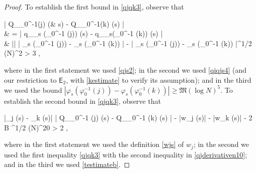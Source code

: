 \documentclass{amsart}
\numberwithin{equation}{section}
\theoremstyle{remark}
\theoremstyle{definition}
\begin{document}
 		\begin{proof} 
 			
 			To establish the first bound in \eqref{qjqk3}, observe that
 			\begin{flalign}
 				\label{qjqk4} 
 				\begin{aligned} 
 				\big| Q_{\varphi_0^{-1}(j)} (& s) - Q_{\varphi_0^{-1}(k)} (s) \big| \\
 				& = \big| q_{\varphi_s (\varphi_0^{-1} (j))} (s) - q_{\varphi_s(\varphi_0^{-1} (k))} (s) \big| \\
 				& \ge |\alpha| \cdot \big| \varphi_s (\varphi_0^{-1} (j)) - \varphi_s (\varphi_0^{-1} (k)) \big| - \big| \varphi_s (\varphi_0^{-1} (j)) - \varphi_s (\varphi_0^{-1} (k)) \big|^{1/2} \cdot (\log N)^2 > 3 ,
 				\end{aligned} 
 			\end{flalign} 
 			
 			\noindent where in the first statement we used \eqref{qjs2}; in the second we used \eqref{qiqjs4} (and our restriction to $\mathsf{E}_2$, with \eqref{kestimate} to verify its assumption); and in the third we used the bound $| \varphi_s (\varphi_0^{-1} (j)) - \varphi_s (\varphi_0^{-1} (k)) | \ge \mathfrak{M} (\log N)^5$. To establish the second bound in \eqref{qjqk3}, observe that 
 			\begin{flalign*}
 				|\mathfrak{Q}_j (s) - _k (s)| \ge \big| Q_{\varphi_0^{-1} (j)} (s) - Q_{\varphi_0^{-1} (k)} (s) \big| - |w_j (s)| - |w_k (s)|  \mathfrak{M} - 2 B ^{1/2} (\log N)^{20} > 2 ,
 			\end{flalign*}	
 			
 			\noindent where in the first statement we used the definition \eqref{wjs} of $w_j$; in the second we used the first inequality \eqref{qjqk3} with the second inequality in \eqref{qjderivativen10}; and in the third we used \eqref{testimateb}.
 		\end{proof} 
 		
\end{document}
